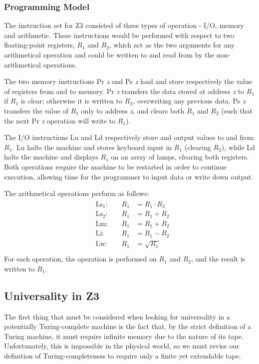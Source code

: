 \documentclass[Master.tex]{subfiles}
\begin{document}
\subsubsection{Programming Model}

The instruction set for Z3 consisted of three types of operation - I/O, memory and arithmetic. These instructions would be performed with respect to two floating-point registers, $R_1$ and $R_2$, which act as the two arguments for any arithmetical operation and could be written to and read from by the non-arithmetical operations. 

The two memory instructions Pr \textit{z} and Ps \textit{z} load and store respectively the value of registers from and to memory. Pr \textit{z} transfers the data stored at address \textit{z} to $R_1$ if $R_1$ is clear; otherwise it is written to $R_2$, overwriting any previous data. Ps \textit{z} transfers the value of $R_1$ only to address \textit{z}, and clears both $R_1$ and $R_2$ (such that the next Pr \textit{z} operation will write to $R_1$). 

The I/O instructions Lu and Ld respectively store and output values to and from $R_1$. Lu halts the machine and stores keyboard input in $R_1$ (clearing $R_2$), while Ld halts the machine and displays $R_1$ on an array of lamps, clearing both registers. Both operations require the machine to be restarted in order to continue execution, allowing time for the programmer to input data or write down output.

The arithmetical operations perform as follows:
\begin{gather*}
\begin{aligned}
&\mathrm{Ls_1}:\quad	&R_1 &= R_1 \cdot R_2 \\
&\mathrm{Ls_2}:\quad	&R_1 &= R_1 \div R_2 \\
&\mathrm{Lm}:\quad	&R_1 &= R_1 + R_2 \\
&\mathrm{Li}:\quad	&R_1 &= R_1 - R_2 \\
&\mathrm{Lw}:\quad	&R_1 &= \sqrt{R_1} \\
\end{aligned}
\end{gather*}
For each operation, the operation is performed on $R_1$ and $R_2$, and the result is written to $R_1$. 
\subsection{Universality in Z3}

The first thing that must be considered when looking for universality in a potentially Turing-complete machine is the fact that, by the strict definition of a Turing machine, it must require infinite memory due to the nature of its tape. Unfortunately, this is impossible in the physical world, so we must revise our definition of Turing-completeness to require only a finite yet extendable tape.
\end{document}
